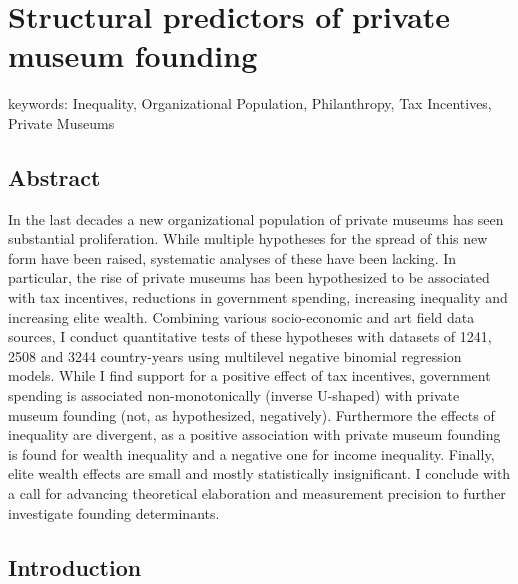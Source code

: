 \documentclass[11pt]{article}
\author{ }
\date{\today}
\title{}
\begin{document}
\section*{Structural predictors of private museum founding}

\noindent
keywords: Inequality, Organizational Population, Philanthropy, Tax Incentives, Private Museums  

\subsection*{Abstract}

In the last decades a new organizational population of private museums has seen substantial proliferation.
While multiple hypotheses for the spread of this new form have been raised, systematic analyses of these have been lacking.
In particular, the rise of private museums has been hypothesized to be associated with tax incentives, reductions in government spending, increasing inequality and increasing elite wealth. 
Combining various socio-economic and art field data sources, I conduct quantitative tests of these hypotheses with datasets of 1241, 2508 and 3244 country-years using multilevel negative binomial regression models.
While I find support for a positive effect of tax incentives, government spending is associated non-monotonically (inverse U-shaped) with private museum founding (not, as hypothesized, negatively). 
Furthermore the effects of inequality are divergent, as a positive association with private museum founding is found for wealth inequality and a negative one for income inequality.
Finally, elite wealth effects are small and mostly statistically insignificant. 
I conclude with a call for advancing theoretical elaboration and measurement precision to further investigate founding determinants. 





\subsection*{Introduction}
\end{document}
